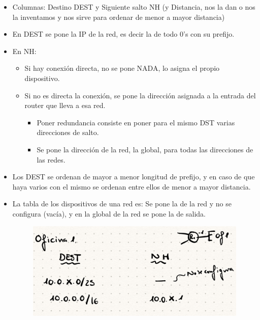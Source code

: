 \documentclass[12pt, twoside, openright]{report} %
\begin{document}
    \begin{itemize}
    \item
      Columnas: Destino DEST y Siguiente salto NH (y Distancia, nos la
      dan o nos la inventamos y nos sirve para ordenar de menor a mayor
      distancia)
    \item
      En DEST se pone la IP de la red, es decir la de todo 0's con su
      prefijo.
    \item
      En NH:

      \begin{itemize}
      \item
        Si hay conexión directa, no se pone NADA, lo asigna el propio
        dispositivo.
      \item
        Si no es directa la conexión, se pone la dirección asignada a la
        entrada del router que lleva a esa red.

        \begin{itemize}
        \item
          Poner redundancia consiste en poner para el mismo DST varias
          direcciones de salto.
        \item
          Se pone la dirección de la red, la global, para todas las
          direcciones de las redes.
        \end{itemize}
      \end{itemize}
    \item
      Los DEST se ordenan de mayor a menor longitud de prefijo, y en
      caso de que haya varios con el mismo se ordenan entre ellos de
      menor a mayor distancia.
    \item
      La tabla de los dispositivos de una red es: Se pone la de la red y
      no se configura (vacía), y en la global de la red se pone la de
      salida.
	  \begin{figure}[H]
		{\includegraphics[scale=.2]{Untitled 32.png}}
	\end{figure}
    \end{itemize}
\end{document}
